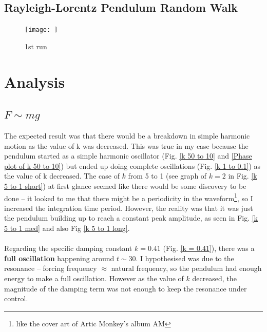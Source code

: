\documentclass[10pt, twocolumn]{article}
\begin{document}
\subsection{Rayleigh-Lorentz Pendulum Random Walk}{\label{rlresults}}
\begin{figure}
    \centering
    \texttt{[image: ]}
    \caption{1st run}
    \label{fig:enter-label}
\end{figure}

\section{Analysis}{\label{analysis}}
\subsection{$F \sim{mg}$}{\label{analysisFmg}}
The expected result was that there would be a breakdown in simple harmonic motion as the value of k was decreased. This was true in my case because the pendulum started as a simple harmonic oscillator (Fig. \ref{k 50 to 10} and \ref{Phase plot of k 50 to 10}) but ended up doing complete oscillations (Fig. \ref{k 1 to 0.1}) as the value of k decreased. The case of $k$ from 5 to 1 (see graph of $k = 2$ in Fig. \ref{k 5 to 1 short}) at first glance seemed like there would be some discovery to be done -- it looked to me that there might be a periodicity in the waveform\footnote{like the cover art of Artic Monkey's album AM}, so I increased the integration time period. However, the reality was that it was just the pendulum building up to reach a constant peak amplitude, as seen in Fig. \ref{k 5 to 1 med} and also Fig \ref{k 5 to 1 long}.\\
\\
Regarding the specific damping constant $k = 0.41$ (Fig. \ref{k = 0.41}), there was a \textbf{full oscillation} happening around $t \sim{30}$. I hypothesised was due to the resonance -- forcing frequency $\approx$ natural frequency, so the pendulum had enough energy to make a full oscillation. However as the value of $k$ decreased, the magnitude of the damping term was not enough to keep the resonance under control.
\end{document}
